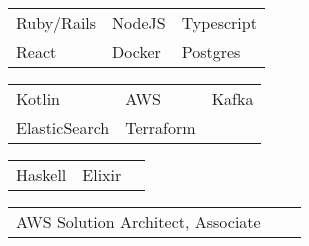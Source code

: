 \documentclass[a4paper,12pt]{memoir} %
\begin{document}
\userinformation %

\framebreak %






{
	\begin{tabular}{p{} p{} p{}}
		\bluebullet Ruby/Rails & \bluebullet NodeJS & \bluebullet Typescript\\
		\bluebullet React & \bluebullet Docker & \bluebullet Postgres\\
	\end{tabular}
}

{
	\begin{tabular}{p{} p{} p{}}
		\bluebullet Kotlin & \bluebullet AWS &  \bluebullet Kafka \\
		\bluebullet ElasticSearch & \bluebullet Terraform
	\end{tabular}
}

{
	\begin{tabular}{p{} p{} p{}}
	\bluebullet Haskell &  \bluebullet Elixir
	\end{tabular}
}

{
	\begin{tabular}{p{} p{} p{}}
	\bluebullet AWS Solution Architect, Associate\\
	\end{tabular}
}

\Sep %

\end{document}
